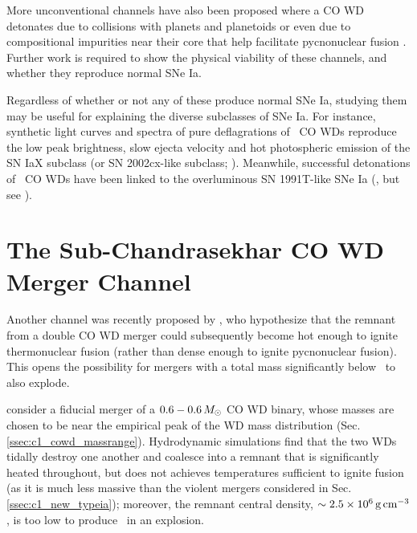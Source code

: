 More unconventional channels have also been proposed where a CO WD detonates due to collisions with planets and planetoids \citep{distfg15} or even due to compositional impurities near their core that help facilitate pycnonuclear fusion \citep{chio+15}.  Further work is required to show the physical viability of these channels, and whether they reproduce normal SNe Ia.  

Regardless of whether or not any of these produce normal SNe Ia, studying them may be useful for explaining the diverse subclasses of SNe Ia.  For instance, synthetic light curves and spectra of pure deflagrations of \Mch\ CO WDs \citep{phil+07, krom+13, fink+14} reproduce the low peak brightness, slow ejecta velocity and hot photospheric emission of the SN IaX subclass (or SN 2002cx-like subclass; \citealt{li+02, fole+13}).  Meanwhile, successful detonations of \Mch\ CO WDs have been linked to the overluminous SN 1991T-like SNe Ia (\citealt{fishj15}, but see \citealt{seit+16}).


\section{The Sub-Chandrasekhar CO WD Merger Channel}
\label{sec:c1_vkchannel}

Another channel was recently proposed by \citeal{vkercj10}, who hypothesize that the remnant from a double CO WD merger could subsequently become hot enough to ignite thermonuclear fusion (rather than dense enough to ignite pycnonuclear fusion).  This opens the possibility for mergers with a total mass significantly below \Mch\ to also explode.

\citeal{vkercj10} consider a fiducial merger of a $0.6-0.6\,\Msun$ CO WD binary, whose masses are chosen to be near the empirical peak of the WD mass distribution (Sec. \ref{ssec:c1_cowd_massrange}).  Hydrodynamic simulations \citep{loreig09} find that the two WDs tidally destroy one another and coalesce into a remnant that is significantly heated throughout, but does not achieves temperatures sufficient to ignite fusion (as it is much less massive than the violent mergers considered in Sec. \ref{ssec:c1_new_typeia}); moreover, the remnant central density, $\sim2.5\times10^6\,\gcc$, is too low to produce \Ni\ in an explosion.  

